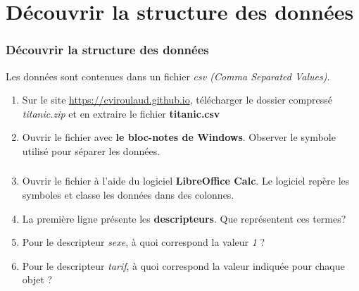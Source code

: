 \documentclass[svgnames,11pt]{beamer}
\begin{document}
\section{Découvrir la structure des données}
\begin{frame}
    \frametitle{Découvrir la structure des données}
    Les données sont contenues dans un fichier \emph{csv (Comma Separated Values)}.
    \begin{activite}
        \begin{enumerate}
            \item Sur le site \url{https://cviroulaud.github.io}, télécharger le dossier compressé \emph{titanic.zip} et en extraire le fichier \textbf{titanic.csv}
            \item Ouvrir le fichier avec \textbf{le bloc-notes de Windows}. Observer le symbole utilisé pour séparer les données.
        \end{enumerate}
    \end{activite}

\end{frame}
\begin{frame}
    \frametitle{}
    \setcounter{compteuractivite}{0}
    \begin{activite}
        \begin{enumerate}
            \setcounter{enumi}{2}
            \item Ouvrir le fichier à l'aide du logiciel \textbf{LibreOffice Calc}. Le logiciel repère les symboles et classe les données dans des colonnes.
            \item La première ligne présente les \textbf{descripteurs}. Que représentent ces termes?
            \item Pour le descripteur \emph{sexe}, à quoi correspond la valeur \emph{1} ?
            \item Pour le descripteur \emph{tarif}, à quoi correspond la valeur indiquée pour chaque objet ?
        \end{enumerate}
    \end{activite}

\end{frame}
\end{document}
